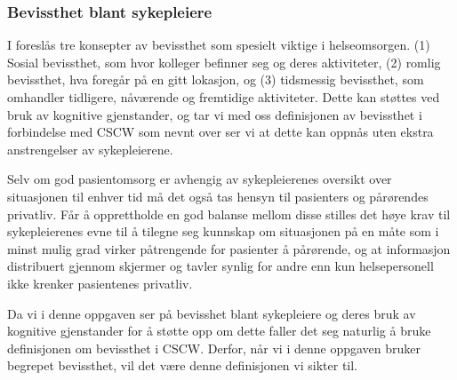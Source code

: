 \subsubsection{Bevissthet blant sykepleiere}
I \cite{Randell} foreslås tre konsepter av bevissthet som spesielt viktige i helseomsorgen. (1) Sosial bevissthet, som hvor kolleger befinner seg og deres aktiviteter, (2) romlig bevissthet, hva foregår på en gitt lokasjon, og (3) tidsmessig bevissthet, som omhandler tidligere, nåværende og fremtidige aktiviteter. 
Dette kan støttes ved bruk av kognitive gjenstander, og tar vi med oss definisjonen av bevissthet i forbindelse med CSCW som nevnt over ser vi at dette kan oppnås uten ekstra anstrengelser av sykepleierene.

\noindent
Selv om god pasientomsorg er avhengig av sykepleierenes oversikt over situasjonen til enhver tid må det også tas hensyn til pasienters og pårørendes privatliv. Får å opprettholde en god balanse mellom disse stilles det høye krav til sykepleierenes evne til å tilegne seg kunnskap om situasjonen på en måte som i minst mulig grad virker påtrengende for pasienter å pårørende, og at informasjon distribuert gjennom skjermer og tavler synlig for andre enn kun helsepersonell ikke krenker pasientenes privatliv\cite{Ebright10}.

\noindent
Da vi i denne oppgaven ser på bevisshet blant sykepleiere og deres bruk av kognitive gjenstander for å støtte opp om dette faller det seg naturlig å bruke definisjonen om bevissthet i CSCW. Derfor, når vi i denne oppgaven bruker begrepet bevissthet, vil det være denne definisjonen vi sikter til.

